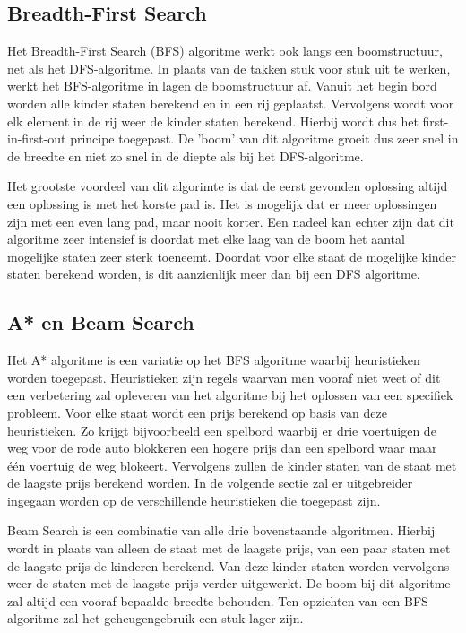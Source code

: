 \documentclass[a4paper]{article}
\begin{document}
\subsection{Breadth-First Search}
Het Breadth-First Search (BFS) algoritme werkt ook langs een boomstructuur, net als het DFS-algoritme. In plaats van de takken stuk voor stuk uit te werken, werkt het BFS-algoritme in lagen de boomstructuur af. Vanuit het begin bord worden alle kinder staten berekend en in een rij geplaatst. Vervolgens wordt voor elk element in de rij weer de kinder staten berekend. Hierbij wordt dus het first-in-first-out principe toegepast. De 'boom' van dit algoritme groeit dus zeer snel in de breedte en niet zo snel in de diepte als bij het DFS-algoritme. 
	
    Het grootste voordeel van dit algorimte is dat de eerst gevonden oplossing altijd een oplossing is met het korste pad is. Het is mogelijk dat er meer oplossingen zijn met een even lang pad, maar nooit korter. Een nadeel kan echter zijn dat dit algoritme zeer intensief is doordat met elke laag van de boom het aantal mogelijke staten zeer sterk toeneemt. Doordat voor elke staat de mogelijke kinder staten berekend worden, is dit aanzienlijk meer dan bij een DFS algoritme.

\subsection{A* en Beam Search}
Het A* algoritme is een variatie op het BFS algoritme waarbij heuristieken worden toegepast. Heuristieken zijn regels waarvan men vooraf niet weet of dit een verbetering zal opleveren van het algoritme bij het oplossen van een specifiek probleem. Voor elke staat wordt een prijs berekend op basis van deze heuristieken. Zo krijgt bijvoorbeeld een spelbord waarbij er drie voertuigen de weg voor de rode auto blokkeren een hogere prijs dan een spelbord waar maar één voertuig de weg blokeert. Vervolgens zullen de kinder staten van de staat met de laagste prijs berekend worden. In de volgende sectie zal er uitgebreider ingegaan worden op de verschillende heuristieken die toegepast zijn.
	
    Beam Search is een combinatie van alle drie bovenstaande algoritmen. Hierbij wordt in plaats van alleen de staat met de laagste prijs, van een paar staten met de laagste prijs de kinderen berekend. Van deze kinder staten worden vervolgens weer de staten met de laagste prijs verder uitgewerkt. De boom bij dit algoritme zal altijd een vooraf bepaalde breedte behouden. Ten opzichten van een BFS algoritme zal het geheugengebruik een stuk lager zijn. 
\end{document}
